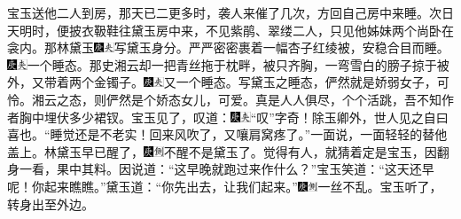 宝玉送他二人到房，那天已二更多时，袭人来催了几次，方回自己房中来睡。次日天明时，便披衣靸鞋往黛玉房中来，不见紫鹃、翠缕二人，只见他姊妹两个尚卧在衾内。那林黛玉{\includegraphics[width=3mm]{../Images/00004}\includegraphics[width=3mm]{../Images/00012}\footnotesize \kaishu 写黛玉身分。}严严密密裹着一幅杏子红绫被，安稳合目而睡。{\includegraphics[width=3mm]{../Images/00004}\includegraphics[width=3mm]{../Images/00012}\footnotesize \kaishu 一个睡态。}那史湘云却一把青丝拖于枕畔，被只齐胸，一弯雪白的膀子掠于被外，又带着两个金镯子。{\includegraphics[width=3mm]{../Images/00004}\includegraphics[width=3mm]{../Images/00012}\footnotesize \kaishu 又一个睡态。写黛玉之睡态，俨然就是娇弱女子，可怜。湘云之态，则俨然是个娇态女儿，可爱。真是人人俱尽，个个活跳，吾不知作者胸中埋伏多少裙钗。}宝玉见了，叹道：{\includegraphics[width=3mm]{../Images/00004}\includegraphics[width=3mm]{../Images/00012}\footnotesize \kaishu ``叹''字奇！除玉卿外，世人见之自曰喜也。}``睡觉还是不老实！回来风吹了，又嚷肩窝疼了。''一面说，一面轻轻的替他盖上。林黛玉早已醒了，{\includegraphics[width=3mm]{../Images/00004}\includegraphics[width=3mm]{../Images/00011}\footnotesize \kaishu 不醒不是黛玉了。}觉得有人，就猜着定是宝玉，因翻身一看，果中其料。因说道：``这早晚就跑过来作什么？''宝玉笑道：``这天还早呢！你起来瞧瞧。''黛玉道：``你先出去，让我们起来。''{\includegraphics[width=3mm]{../Images/00004}\includegraphics[width=3mm]{../Images/00011}\footnotesize \kaishu 一丝不乱。}宝玉听了，转身出至外边。

